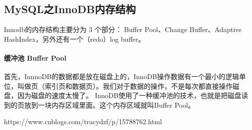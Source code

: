 \documentclass[../../../interview-questions.tex]{subfiles}
\begin{document}
\subsection{MySQL之InnoDB内存结构}

Innodb的内存结构主要分为 3 个部分： Buffer Pool、Change Buffer、Adaptive HashIndex，另外还有一个（redo）log buffer。

\paragraph{缓冲池 Buffer Pool}

首先，InnnoDB的数据都是放在磁盘上的，InnoDB操作数据有一个最小的逻辑单位，叫做页（索引页和数据页）。我们对于数据的操作，不是每次都直接操作磁盘，因为磁盘的速度太慢了。 InnoDB使用了一种缓冲池的技术，也就是把磁盘读到的页放到一块内存区域里面。这个内存区域就叫Buffer Pool。


https://www.cnblogs.com/tracydzf/p/15788762.html
\end{document}
